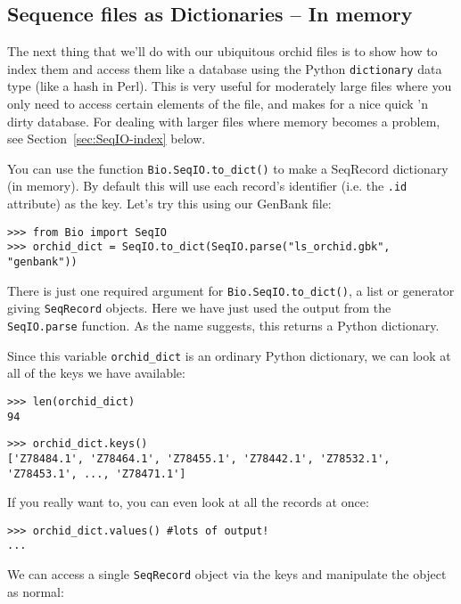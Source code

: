 \documentclass{report}
\begin{document}
\subsection{Sequence files as Dictionaries -- In memory}
\label{SeqIO:to_dict}

The next thing that we'll do with our ubiquitous orchid files is to show how
to index them and access them like a database using the Python \verb|dictionary|
data type (like a hash in Perl). This is very useful for moderately large files
where you only need to access certain elements of the file, and makes for a nice
quick 'n dirty database. For dealing with larger files where memory becomes a
problem, see Section~\ref{sec:SeqIO-index} below.

You can use the function \verb|Bio.SeqIO.to_dict()| to make a SeqRecord dictionary
(in memory).  By default this will use each record's identifier (i.e. the \verb|.id|
attribute) as the key.  Let's try this using our GenBank file:

\begin{verbatim}
>>> from Bio import SeqIO
>>> orchid_dict = SeqIO.to_dict(SeqIO.parse("ls_orchid.gbk", "genbank"))
\end{verbatim}

There is just one required argument for \verb|Bio.SeqIO.to_dict()|, a list or
generator giving \verb|SeqRecord| objects. Here we have just used the output
from the \verb|SeqIO.parse| function. As the name suggests, this returns a
Python dictionary.

Since this variable \verb|orchid_dict| is an ordinary Python dictionary, we can look at all of the keys we have available:

\begin{verbatim}
>>> len(orchid_dict)
94
\end{verbatim}
\begin{verbatim}
>>> orchid_dict.keys()
['Z78484.1', 'Z78464.1', 'Z78455.1', 'Z78442.1', 'Z78532.1', 'Z78453.1', ..., 'Z78471.1']
\end{verbatim}

If you really want to, you can even look at all the records at once:
\begin{verbatim}
>>> orchid_dict.values() #lots of output!
...
\end{verbatim}

We can access a single \verb|SeqRecord| object via the keys and manipulate the object as normal:
\end{document}

